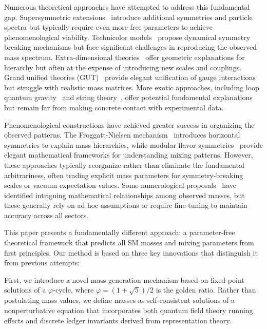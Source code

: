 \documentclass[%
amsmath,amssymb,
aps,
prb,
floatfix, showkeys, 10pt,
]{revtex4-2}
\begin{document}
Numerous theoretical approaches have attempted to address this fundamental gap. Supersymmetric extensions~\cite{dine-1993,Wess1974} introduce additional symmetries and particle spectra but typically require even more free parameters to achieve phenomenological viability. Technicolor models~\cite{Susskind1979,hill-2003,technicolor-2015} propose dynamical symmetry breaking mechanisms but face significant challenges in reproducing the observed mass spectrum. Extra-dimensional theories~\cite{Randall1999} offer geometric explanations for hierarchy but often at the expense of introducing new scales and couplings. Grand unified theories (GUT)~\cite{grand-uni-th-2015} provide elegant unification of gauge interactions but struggle with realistic mass matrices. More exotic approaches, including loop quantum gravity~\cite{Rovelli2004,loop-qg} and string theory~\cite{polchinski-1998}, offer potential fundamental explanations but remain far from making concrete contact with experimental data.

Phenomenological constructions have achieved greater success in organizing the observed patterns. The Froggatt-Nielsen mechanism~\cite{frog-1979,fritz-2000} introduces horizontal symmetries to explain mass hierarchies, while modular flavor symmetries~\cite{petcov} provide elegant mathematical frameworks for understanding mixing patterns. However, these approaches typically reorganize rather than eliminate the fundamental arbitrariness, often trading explicit mass parameters for symmetry-breaking scales or vacuum expectation values. Some numerological proposals~\cite{koide-1983,eln-2002,eln-2002-1,cascade-2003} have identified intriguing mathematical relationships among observed masses, but these generally rely on ad hoc assumptions or require fine-tuning to maintain accuracy across all sectors.


This paper presents a fundamentally different approach: a  parameter-free theoretical framework that predicts all SM masses and mixing parameters from first principles. Our method is based on three key innovations that distinguish it from previous attempts:

First, we introduce a novel mass generation mechanism based on fixed-point solutions of a $\varphi$-cycle, where $\varphi = (1+\sqrt{5})/2$ is the golden ratio. Rather than postulating mass values, we define masses as self-consistent solutions of a nonperturbative equation that incorporates both quantum field theory running effects and discrete ledger invariants derived from representation theory.
\end{document}
